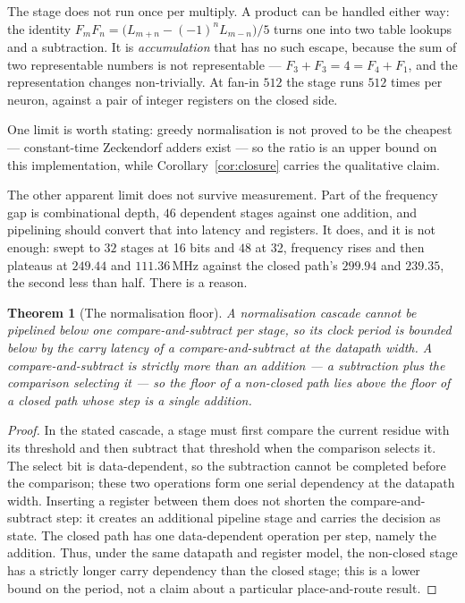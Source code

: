 \documentclass[11pt]{article}
\newtheorem{theorem}{Theorem}
\theoremstyle{definition}
\begin{document}
The stage does not run once per multiply. A product can be handled either way:
the identity $F_mF_n = \bigl(L_{m+n}-(-1)^nL_{m-n}\bigr)/5$ turns one into two
table lookups and a subtraction. It is \emph{accumulation} that has no such
escape, because the sum of two representable numbers is not representable ---
$F_3+F_3 = 4 = F_4+F_1$, and the representation changes non-trivially. At fan-in
$512$ the stage runs $512$ times per neuron, against a pair of integer registers
on the closed side.

One limit is worth stating: greedy normalisation is not proved to be the
cheapest --- constant-time Zeckendorf adders exist --- so the ratio is an upper
bound on this implementation, while Corollary~\ref{cor:closure} carries the
qualitative claim.

The other apparent limit does not survive measurement. Part of the frequency gap
is combinational depth, $46$ dependent stages against one addition, and
pipelining should convert that into latency and registers. It does, and it is
not enough: swept to $32$ stages at 16 bits and $48$ at 32, frequency rises and
then plateaus at $249.44$ and $111.36$\,MHz against the closed path's $299.94$
and $239.35$, the second less than half. There is a reason.

\begin{theorem}[The normalisation floor]\label{thm:normfloor}
A normalisation cascade cannot be pipelined below one compare-and-subtract per
stage, so its clock period is bounded below by the carry latency of a
compare-and-subtract at the datapath width. A compare-and-subtract is strictly
more than an addition --- a subtraction plus the comparison selecting it --- so
the floor of a non-closed path lies above the floor of a closed path whose step
is a single addition.
\end{theorem}
\begin{proof}
In the stated cascade, a stage must first compare the current residue with its
threshold and then subtract that threshold when the comparison selects it.
The select bit is data-dependent, so the subtraction cannot be completed before
the comparison; these two operations form one serial dependency at the
datapath width. Inserting a register between them does not shorten the
compare-and-subtract step: it creates an additional pipeline stage and carries
the decision as state. The closed path has one data-dependent operation per
step, namely the addition. Thus, under the same datapath and register model,
the non-closed stage has a strictly longer carry dependency than the closed
stage; this is a lower bound on the period, not a claim about a particular
place-and-route result.
\end{proof}
\end{document}
